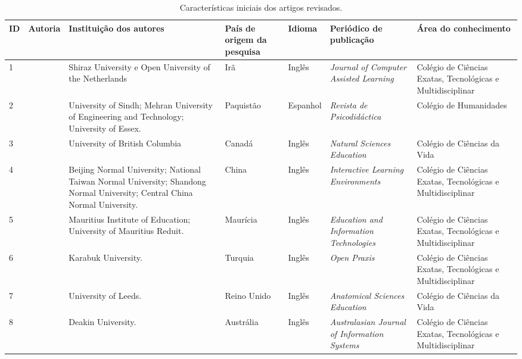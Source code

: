\documentclass[portuguese]{textolivre}
\begin{document}
\begin{scriptsize}
\begin{longtable}{p{}p{}p{}p{}p{}p{}p{}}
\caption{Características iniciais dos artigos revisados.}
\label{tab3}
\\
\toprule 
ID & Autoria & Instituição dos autores & País de origem da pesquisa & Idioma & Periódico de publicação & Área do conhecimento
\\
\midrule
1 & \textcite{heidari2021} & Shiraz University e Open University of the Netherlands & Irã & Inglês & \emph{Journal of Computer Assisted Learning} & Colégio de Ciências Exatas, Tecnológicas e Multidisciplinar
\\
2 & \textcite{shah2021} & University of Sindh;
Mehran University of Engineering and Technology; University of Essex. & Paquistão & Espanhol & \textit{Revista de Psicodidáctica} &
Colégio de Humanidades
\\
3 & \textcite{walker2021} & University of British Columbia & Canadá & Inglês & \textit{Natural Sciences Education} & Colégio de Ciências da Vida
\\
4 & \textcite{luan2020} & Beijing Normal University; National Taiwan Normal University; Shandong Normal University;
Central China Normal University. & China & Inglês & \textit{Interactive Learning Environments} & Colégio de Ciências Exatas, Tecnológicas e Multidisciplinar
\\
5 & \textcite{rajabalee2021} & Mauritius Institute of Education;
University of Mauritius Reduit. & Maurícia & Inglês & \textit{Education and Information Technologies} & Colégio de Ciências Exatas, Tecnológicas e Multidisciplinar
\\
6 & \textcite{ergun2020} & Karabuk University. & Turquia & Inglês & \textit{Open Praxis} & Colégio de Ciências Exatas, Tecnológicas e Multidisciplinar
\\
7 & \textcite{pickering2019} & University of Leeds. & Reino Unido & Inglês & \textit{Anatomical Sciences Education} & Colégio de Ciências da Vida
\\
8 & \textcite{pye2018} & Deakin University. & Austrália & Inglês & \textit{Australasian Journal of Information Systems} & Colégio de Ciências Exatas, Tecnológicas e Multidisciplinar

\end{longtable}
\end{scriptsize}
\end{document}
